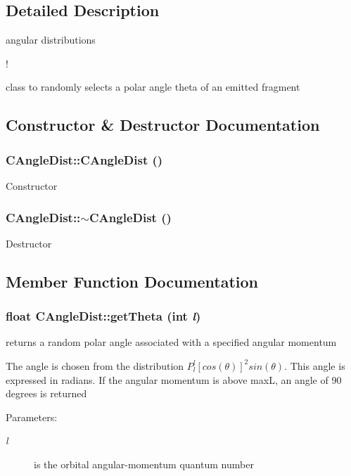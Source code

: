 \subsection{Detailed Description}
angular distributions 

!

class to randomly selects a polar angle theta of an emitted fragment 



\subsection{Constructor \& Destructor Documentation}
\subsubsection{\setlength{\rightskip}{0pt plus 5cm}CAngle\-Dist::CAngle\-Dist ()}\label{classCAngleDist_7d0a03e324dbc057936fb8d1ca329089}


Constructor 
\subsubsection{\setlength{\rightskip}{0pt plus 5cm}CAngle\-Dist::$\sim$CAngle\-Dist ()}\label{classCAngleDist_4cf4d259ad78aa8750dfaf44f6223802}


Destructor 

\subsection{Member Function Documentation}
\subsubsection{\setlength{\rightskip}{0pt plus 5cm}float CAngle\-Dist::get\-Theta (int {\em l})}\label{classCAngleDist_4e5248b7137abe1f54bfaf507481b359}


returns a random polar angle associated with a specified angular momentum 

The angle is chosen from the distribution $P_l^l[cos(\theta)]^2 sin(\theta)$. This angle is expressed in radians. If the angular momentum is above max\-L, an angle of 90 degrees is returned \begin{Desc}
\item[Parameters:]
\begin{description}
\item[{\em l}]is the orbital angular-momentum quantum number \end{description}
\end{Desc}



